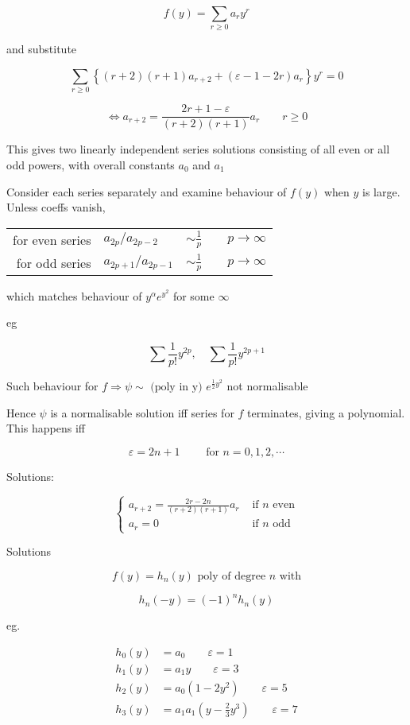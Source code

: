 \documentclass[a4paper]{article}
\begin{document}
\[ f(y) = \sum_{r\geq 0} a_{r} y^{r} \]

and substitute

\[ \sum_{r\geq 0} \left\{   (r+2)(r+1)a_{r+2} + (\varepsilon  - 1 - 2r) a_{r}    \right\} y^{r} = 0  \]


\[ \iff a_{r+2} = \frac{2r + 1 - \varepsilon}{(r+2)(r+1)} a_{r} \qquad r \geq 0 \]

This gives two linearly independent series solutions consisting of all even or all odd powers, with overall constants $ a_{0} $ and $ a_{1} $

Consider each series separately and examine behaviour of $ f(y) $ when $ y $ is large. Unless coeffs vanish,

\begin{center}
	\begin{tabular}{rlll}
		for even series & $a_{2p} / a_{2p - 2} $ & $\sim \frac{1}{p}$ & $ \quad p \to \infty $\\
		for odd series & $a_{2p+1} / a_{2p - 1} $ & $\sim \frac{1}{p}$ & $ \quad  p \to \infty $
	\end{tabular}
\end{center}

which matches behaviour of $ y^{\alpha} e^{y^{2}} $ for some $ \infty $

eg

\[ \sum \frac{1}{p!} y^{2p}, \quad \sum \frac{1}{p!} y^{2p + 1}  \]

Such behaviour for $ f \Rightarrow \psi \sim \text{ (poly in y) }e^{\frac{1}{2}y^{2}}  $ not normalisable

Hence $ \psi $ is a normalisable solution iff series for $ f $ terminates, giving a polynomial. This happens iff

\[ \varepsilon = 2n + 1 \qquad \text{ for } n = 0,1,2,\cdots \]

Solutions:

\[ \begin{cases}  a_{r+2} = \frac{2r - 2n}{(r+2)(r+1)} a_{r} & \text{ if } n \text{ even} \\ a_{r} = 0 & \text{ if } n \text{ odd}\end{cases} \]

Solutions

\[ f(y) = h_{n}(y) \text{ poly of degree } n \text{ with} \]

\[ h_{n}(-y) = (-1)^{n} h_{n}(y) \]

eg.


\begin{align*}
h_{0}(y) & = a_{0}  \qquad \varepsilon = 1\\
h_{1}(y) & = a_{1} y \qquad \varepsilon = 3\\
h_{2}(y) & = a_{0} (1 - 2y^{2}) \qquad \varepsilon = 5\\
h_{3}(y) & = a_{1} a_{1} (y - \frac{2}{3} y^{3}) \qquad \varepsilon = 7\\
\end{align*}
\end{document}
